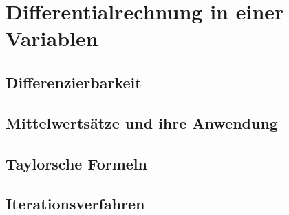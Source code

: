 \chapter{Differentialrechnung in einer Variablen}
\section{Differenzierbarkeit}
\section{Mittelwertsätze und ihre Anwendung}
\section{Taylorsche Formeln}
\section{Iterationsverfahren}
